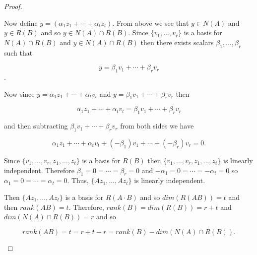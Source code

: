 \documentclass[12pt]{article}
\theoremstyle{definition}
\begin{document}
\begin{proof}
\begin{enumerate}[label = (\arabic*)]
Now define $y = (\alpha_1 z_1 + \cdots + \alpha_t z_t)$. From above we see that $y \in N(A)$
and $y \in R(B)$ and so $y \in N(A) \cap R(B)$. Since $\{v_1, \ldots, v_r\}$ is a basis
for $N(A) \cap R(B)$ and $y \in N(A) \cap R(B)$ then there exists scalars
$\beta_1, \ldots, \beta_r$ such that

\[y = \beta_1 v_1 + \cdots + \beta_r v_r \].

Now since $y = \alpha_1 z_1 + \cdots + \alpha_t v_t$ and 
$y = \beta_1 v_1 + \cdots + \beta_r v_r$ then 

\[ \alpha_1 z_1 + \cdots + \alpha_t v_t = \beta_1 v_1 + \cdots + \beta_r v_r \]

and then subtracting $\beta_1 v_1 + \cdots + \beta_r v_r$ from both sides we have

\[ \alpha_1 z_1 + \cdots + \alpha_t v_t + (-\beta_1) v_1 + \cdots + (-\beta_r) v_r = 0. \]

Since $\{ v_1, \ldots, v_r, z_1, \ldots, z_t \}$ is a basis for $R(B)$ then
$\{ v_1, \ldots, v_r, z_1, \ldots, z_t \}$ is linearly independent. Therefore
$\beta_1 = 0 = \cdots = \beta_r = 0$ and $-\alpha_1 = 0 = \cdots = -\alpha_t = 0$ so
$\alpha_1 = 0 = \cdots = \alpha_t = 0$. Thus, $\{Az_1, \ldots, Az_t\}$ is linearly
independent.

Then $\{Az_1, \ldots, Az_t\}$ is a basis for $R(A \cdot B)$ and so $dim(R(AB)) = t$ and
then $rank(AB) = t$. Therefore, $rank(B) = dim(R(B)) = r + t$ and $dim(N(A) \cap R(B)) = r$
and so

\[ rank(AB) = t = r + t - r = rank(B) - dim(N(A) \cap R(B)). \]
\end{enumerate}

\end{proof}
\end{document}
